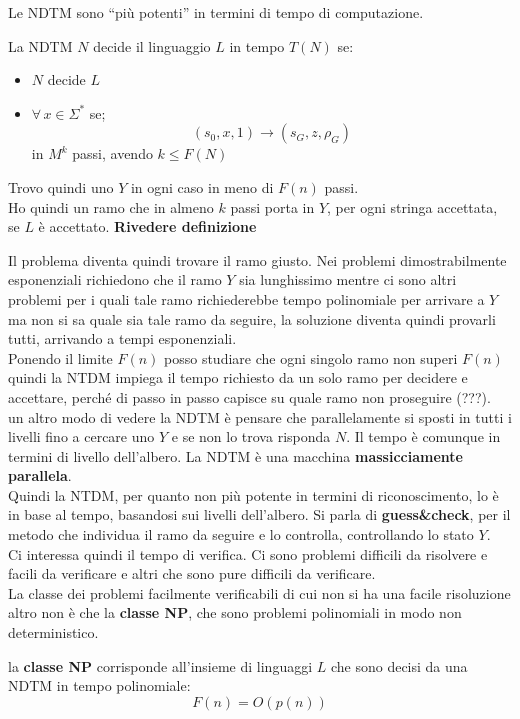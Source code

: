Le NDTM sono ``più potenti'' in termini di tempo di computazione.
\begin{definizione}
  La NDTM $N$ decide il linguaggio $L$ in tempo $T(N)$ se:
  \begin{itemize}
    \item $N$ decide $L$
    \item $\forall\,x\in \Sigma^*$ se;
    \[(s_0,x,1)\to(s_G, z, \rho_G)\]
    in $M^k$ passi, avendo $k\leq F(N)$
  \end{itemize}
  Trovo quindi uno $Y$ in ogni caso in meno di $F(n)$ passi.\\
  Ho quindi un ramo che in almeno $k$ passi porta in $Y$, per ogni stringa
  accettata, se $L$ è accettato. 
  \textbf{Rivedere definizione}
\end{definizione}
Il problema diventa quindi trovare il ramo giusto. Nei problemi dimostrabilmente
esponenziali richiedono che il ramo $Y$ sia lunghissimo mentre ci sono altri
problemi per i quali tale ramo richiederebbe tempo polinomiale per arrivare a
$Y$ ma non si sa quale sia tale ramo da seguire, la soluzione diventa quindi
provarli tutti, arrivando a tempi esponenziali.\\
Ponendo il limite $F(n)$ posso studiare che ogni singolo ramo non superi $F(n)$
quindi la NTDM impiega il tempo richiesto da un solo ramo per decidere e
accettare, perché di passo in passo capisce su quale ramo non proseguire
(???).\\
un altro modo di vedere la NDTM è pensare che parallelamente si sposti in tutti
i livelli fino a cercare uno $Y$ e se non lo trova risponda $N$. Il tempo è
comunque in termini di livello dell'albero. La NDTM è una macchina
\textbf{massicciamente parallela}.\\
Quindi la NTDM, per quanto non più potente in termini di riconoscimento, lo è in
base al tempo, basandosi sui livelli dell'albero. 
Si parla di \textbf{guess\&check}, per il metodo che individua il ramo da
seguire e lo controlla, controllando lo stato $Y$.\\
Ci interessa quindi il tempo di verifica. Ci sono problemi difficili da
risolvere e facili da verificare e altri che sono pure difficili da
verificare.\\
La classe dei problemi facilmente verificabili di cui non si ha una facile
risoluzione altro non è che la \textbf{classe NP}, che sono problemi polinomiali
in modo non deterministico.
\begin{definizione}
  la \textbf{classe NP} corrisponde all'insieme di linguaggi $L$ che sono decisi
  da una NDTM in tempo polinomiale:
  \[F(n)=O(p(n))\]
\end{definizione}
